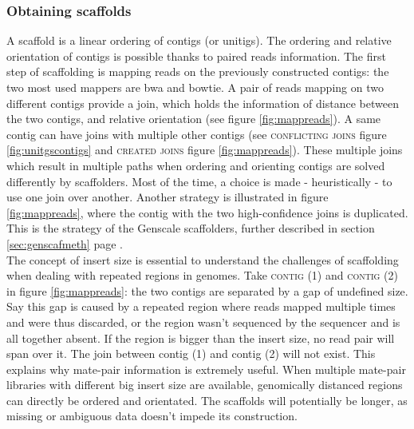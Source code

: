 \documentclass[12pt]{article}
\newcommand*{\fulleref}[1]{section \hyperref[{#1}] {\ref*{#1}} page {\pageref{#1}}}%
\begin{document}
\subsubsection{Obtaining scaffolds}
A scaffold is a linear ordering of contigs (or unitigs). The ordering and relative orientation of contigs is possible thanks to paired reads information. The first step of scaffolding is mapping reads on the previously constructed contigs: the two most used mappers are bwa \cite{li_fast_2009} and bowtie\cite{langmead_fast_2012,langmead_ultrafast_2009}. A pair of reads mapping on two different contigs provide a join, which holds the information of distance between the two contigs, and relative orientation (see figure \ref{fig:mappreads}).  A same contig can have joins with multiple  other contigs (see \textsc{conflicting joins} figure \ref{fig:unitgscontigs} and \textsc{created joins} figure \ref{fig:mappreads}). These multiple joins which result in multiple paths when ordering and orienting contigs are solved differently by scaffolders. Most of the time, a choice is made - heuristically - to use one join over another. Another strategy is illustrated in figure \ref{fig:mappreads}, where the contig with the two high-confidence joins is duplicated. This is the strategy of the Genscale scaffolders, further described in \fulleref{sec:genscafmeth}. \\
The concept of insert size is essential to understand the challenges of scaffolding when dealing with repeated regions in genomes. Take \textsc{contig (1)} and \textsc{contig (2)} in figure \ref{fig:mappreads}: the two contigs are separated by a gap of undefined size. Say this gap is caused by a repeated region where reads mapped multiple times and were thus discarded, or the region wasn't sequenced by the sequencer and is all together absent. If the region is bigger than the insert size, no read pair will span over it. The join between contig (1) and contig (2) will not exist. This explains why mate-pair information is extremely useful. When multiple mate-pair libraries with different big insert size are available, genomically distanced regions can directly be ordered and orientated. The scaffolds will potentially be longer, as missing or ambiguous data doesn't impede its construction.
\end{document}
